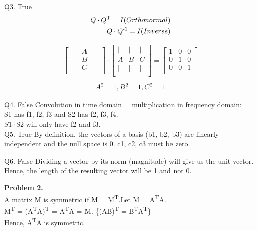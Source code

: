 \documentclass[a4paper]{article}
\begin{document}
\hfill \newline
Q3. True \newline
\begin{align}
Q \cdot Q\textsuperscript{T} = I (Orthonormal)\\
Q \cdot Q\textsuperscript{-1} = I   (Inverse)
\end{align}

\begin{align}  
\begin{bmatrix}
   - & A & -\\
   - & B & - \\
   - & C & - \\\end{bmatrix}
\cdot
\begin{bmatrix}
   | & | & | \\
   A & B & C \\
   | & | & | \\
\end{bmatrix}
=
\begin{bmatrix}
   1 & 0 & 0 \\
   0 & 1 & 0 \\
   0 & 0 & 1 \\
\end{bmatrix}
\end{align}
\begin{align}
A\textsuperscript{2} = 1, B\textsuperscript{2} = 1, C\textsuperscript{2} = 1 
\end{align}

\hfill \newline
Q4. False\newline
Convolution in time domain = multiplication in frequency domain: \\
S1 has f1, f2, f3 and S2 has f2, f3, f4.\\
$S1 \cdot $S2 will only have f2 and f3. \\ 

\hfill \newline
Q5. True\newline
By definition, the vectors of a basis (b1, b2, b3) are linearly independent and the null space is 0. c1, c2, c3 must be zero. 

\hfill \newline
Q6. False \newline
Dividing a vector by its norm (magnitude) will give us the unit vector. Hence, the length of the resulting vector will be 1 and not 0.

\hfill \newline
\textbf{Problem 2.}\\ \newline
A matrix M is symmetric if M = M\textsuperscript{T}.\newline Let M = A\textsuperscript{T}A.\\
M\textsuperscript{T} = (A\textsuperscript{T}A)\textsuperscript{T} = A\textsuperscript{T}A = M. \hfill \{(AB)\textsuperscript{T} = B\textsuperscript{T}A\textsuperscript{T}\}\\
Hence, A\textsuperscript{T}A is symmetric.
\end{document}
